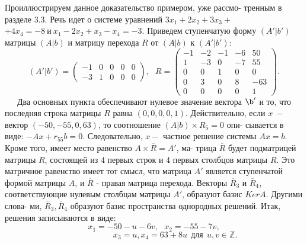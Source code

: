 	Проиллюстрируем данное доказательство примером, уже рассмо-\linebreak
	тренным в разделе 3.3. Речь идет о системе уравнений $3x_1 + 2x_2 + 3x_3 +$\linebreak
	$+ 4x_4 = -8\ \text{и} \ x_1 - 2x_2 + x_3 - x_4 = -3$. Приведем ступенчатую форму\linebreak
	$(A' | b')$ матрицы $(A | b)$ и матрицу перехода $R$ от $(A | b)$ к $(A' | b')$:
	$$(A' | b') = \begin{pmatrix} -1 & 0 & 0 & 0 & 0 \\ -3 & 1 & 0 & 0 & 0 \end{pmatrix},\ \ \  R = \begin{pmatrix} -1 & -2 & -1 & -6 & 50 \\ 1 & -3 & 0 & -7 & 55 \\ 0 & 0 & 1 & 0 & 0 \\ 0 & 3 & 0 & 8 & -63 \\ 0 & 0 & 0 & 0 & 1 \end{pmatrix}.$$
	\ \ \ Два основных пункта обеспечивают нулевое значение вектора $\b'$ и\linebreak
	то, что последняя строка матрицы $R$ равна $(0, 0, 0, 0, 1)$. Действительно,\linebreak
	если $x \ -$ вектор $(-50, -55, 0, 63)$, то соотношение $(A | b)\times R_5 = 0$ опи-\linebreak
	сывается в виде: $-Ax + r_{55}b = 0$. Следовательно, $x - $ частное решение\linebreak
	системы $Ax = b$. Кроме того, имеет место равенство $A\times\overline{R} = A'$, ма-\linebreak
	трица $\overline{R}$ будет подматрицей матрицы $R$, состоящей из 4 первых строк\linebreak
	и 4 первых столбцов матрицы $R$. Это матричное равенство имеет тот\linebreak
	смысл, что матрица $A'$ является ступенчатой формой матрицы $A$, и\linebreak
	$\overline{R}$ - правая матрица перехода. Векторы $\overline{R}_3$ и $\overline{R}_4$, соответствующие\linebreak
	нулевым столбцам матрицы $A'$, образуют базис $KerA$. Другими слова-\linebreak
	ми, $\overline{R}_3, \overline{R}_4$ образуют базис пространства однородных решений. Итак,\linebreak
	решения записываются в виде:
	$$x_1 = -50 - u - 6v, \ \ \ x_2 = -55 - 7v,$$
	$$ \ \ \ \ \ \ \ \ \ \ \ \ \ \ \ \ \ \ \ \ \ \ \ x_3 = u, x_4 = 63 + 8u \ \ \text{для} \ \ u, v \in \mathbb Z.$$
	
